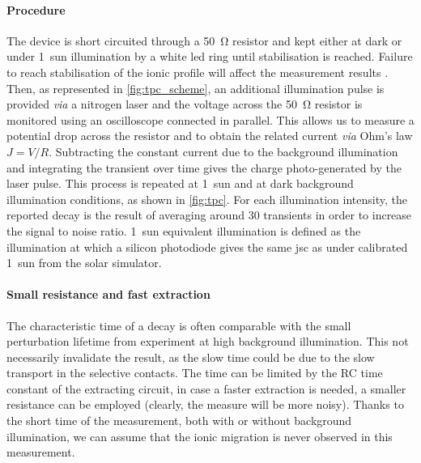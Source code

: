 	\paragraph{Procedure}
	The device is short circuited through a \SI{50}{\ohm} resistor and kept either at dark or under 1~sun illumination by a white \gls{led} ring until stabilisation is reached.
	Failure to reach stabilisation of the ionic profile will affect the measurement results \cite{Belisle2017}.
	Then, as represented in \cref{fig:tpc_scheme}, an additional illumination pulse is provided \textsl{via} a nitrogen laser and the voltage across the \SI{50}{\ohm} resistor is monitored using an oscilloscope connected in parallel.
	This allows us to measure a potential drop across the resistor and to obtain the related current \textsl{via} Ohm's law $J = V / R$.
	Subtracting the constant current due to the background illumination and integrating the transient over time gives the charge photo\hyp{}generated by the laser pulse.
	This process is repeated at 1~sun and at dark background illumination conditions, as shown in \cref{fig:tpc}.
	For each illumination intensity, the reported decay is the result of averaging around 30 transients in order to increase the signal to noise ratio.
	1~sun equivalent illumination is defined as the illumination at which a silicon photodiode gives the same \gls{jsc} as under calibrated 1~sun from the solar simulator.

	\paragraph{Small resistance and fast extraction}
	The characteristic time of a  decay is often comparable with the small perturbation lifetime from  experiment at high background illumination.
	This not necessarily invalidate the  result, as the slow time could be due to the slow transport in the selective contacts.
	The  time can be limited by the RC time constant of the extracting circuit, in case a faster extraction is needed, a smaller resistance can be employed (clearly, the measure will be more noisy).
	Thanks to the short time of the measurement, both with or without background illumination, we can assume that the ionic migration is never observed in this measurement.


